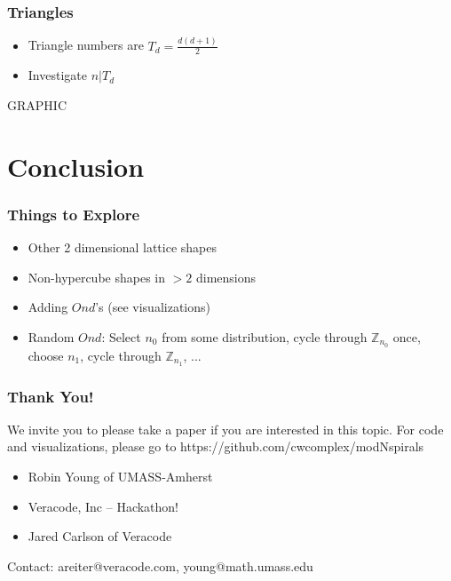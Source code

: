\documentclass{beamer}
\theoremstyle{mydef}
\begin{document}
\frame
{
  \frametitle{Triangles}
  \begin{itemize}
  \item Triangle numbers are $T_d = \frac{d(d+1)}{2}$
    \item Investigate $n \vert T_d$
 \end{itemize}
  GRAPHIC
}

\section{Conclusion}
\frame
{
  \frametitle{Things to Explore}
  \begin{itemize}
  \item Other 2 dimensional lattice shapes
  \item Non-hypercube shapes in $>2$ dimensions
  \item Adding $Ond$'s (see visualizations)
  \item Random $Ond$: Select $n_0$ from some distribution, cycle through $\mathbb{Z}_{n_0}$ once, choose $n_1$,  cycle through $\mathbb{Z}_{n_1}$, ...
  \end{itemize}
}
\frame
{
  \frametitle{Thank You!}
  We invite you to please take a paper if you are interested in this topic. For code and visualizations, please go to https://github.com/cwcomplex/modNspirals
  \begin{itemize}
  \item Robin Young of UMASS-Amherst
  \item Veracode, Inc -- Hackathon!
  \item Jared Carlson of Veracode
  \end{itemize}
  Contact: areiter@veracode.com, young@math.umass.edu
}
\end{document}
